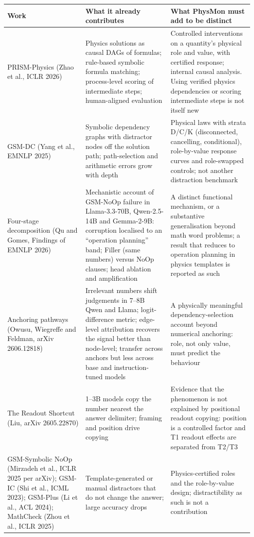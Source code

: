\documentclass[10pt,a4paper]{article}
\begin{document}
\begin{center}\small
\begin{longtable}{@{}P{4.0cm}P{5.4cm}P{6.4cm}@{}}
\toprule
Work & What it already contributes & What PhysMon must add to be distinct \\
\midrule\endhead
PRISM-Physics (Zhao et al., ICLR 2026) & Physics solutions as causal DAGs of formulas; rule-based symbolic formula matching; process-level scoring of intermediate steps; human-aligned evaluation & Controlled interventions on a quantity's physical role and value, with certified response; internal causal analysis. Using verified physics dependencies or scoring intermediate steps is not itself new \\
GSM-DC (Yang et al., EMNLP 2025) & Symbolic dependency graphs with distractor nodes off the solution path; path-selection and arithmetic errors grow with depth & Physical laws with strata D/C/K (disconnected, cancelling, conditional), role-by-value response curves and role-swapped controls; not another distraction benchmark \\
Four-stage decomposition (Qu and Gomes, Findings of EMNLP 2026) & Mechanistic account of GSM-NoOp failure in Llama-3.3-70B, Qwen-2.5-14B and Gemma-2-9B: corruption localised to an ``operation planning'' band; Filler (same numbers) versus NoOp clauses; head ablation and amplification & A distinct functional mechanism, or a substantive generalisation beyond math word problems; a result that reduces to operation planning in physics templates is reported as such \\
Anchoring pathways (Owusu, Wiegreffe and Feldman, arXiv 2606.12818) & Irrelevant numbers shift judgements in 7--8B Qwen and Llama; logit-difference metric; edge-level attribution recovers the signal better than node-level; transfer across anchors but less across base and instruction-tuned models & A physically meaningful dependency-selection account beyond numerical anchoring: role, not only value, must predict the behaviour \\
The Readout Shortcut (Liu, arXiv 2605.22870) & 1--3B models copy the number nearest the answer delimiter; framing and position drive copying & Evidence that the phenomenon is not explained by positional readout copying: position is a controlled factor and T1 readout effects are separated from T2/T3 \\
GSM-Symbolic NoOp (Mirzadeh et al., ICLR 2025 per arXiv); GSM-IC (Shi et al., ICML 2023); GSM-Plus (Li et al., ACL 2024); MathCheck (Zhou et al., ICLR 2025) & Template-generated or manual distractors that do not change the answer; large accuracy drops & Physics-certified roles and the role-by-value design; distractibility as such is not a contribution \\

\end{longtable}
\end{center}
\end{document}

